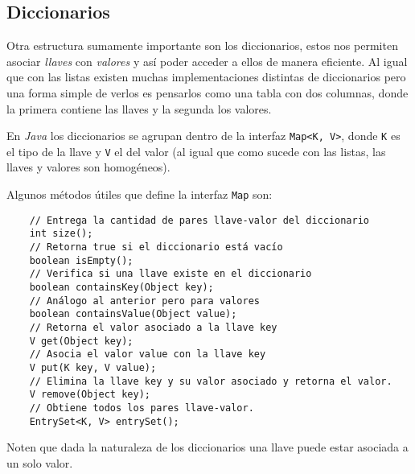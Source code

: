 \subsection{Diccionarios}
  Otra estructura sumamente importante son los diccionarios, estos nos permiten asociar 
  \textit{llaves} con \textit{valores} y así poder acceder a ellos de manera eficiente.
  Al igual que con las listas existen muchas implementaciones distintas de diccionarios pero una
  forma simple de verlos es pensarlos como una tabla con dos columnas, donde la primera contiene las
  llaves y la segunda los valores.

  En \textit{Java} los diccionarios se agrupan dentro de la interfaz \texttt{Map<K, V>},
  donde \texttt{K} es el tipo de la llave y \texttt{V} el del valor (al igual que como sucede con 
  las listas, las llaves y valores son homogéneos).

  Algunos métodos útiles que define la interfaz \texttt{Map} son:
  \begin{verbatim}
    // Entrega la cantidad de pares llave-valor del diccionario
    int size();
    // Retorna true si el diccionario está vacío
    boolean isEmpty();
    // Verifica si una llave existe en el diccionario
    boolean containsKey(Object key);
    // Análogo al anterior pero para valores
    boolean containsValue(Object value);
    // Retorna el valor asociado a la llave key
    V get(Object key);
    // Asocia el valor value con la llave key
    V put(K key, V value);
    // Elimina la llave key y su valor asociado y retorna el valor.
    V remove(Object key);
    // Obtiene todos los pares llave-valor.
    EntrySet<K, V> entrySet();
  \end{verbatim}

  Noten que dada la naturaleza de los diccionarios una llave puede estar asociada a un solo valor.

